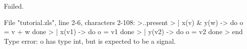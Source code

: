 \runverbatimfalse
{}
\begin{RunVerbatimMsg}
Failed.
\end{RunVerbatimMsg}
\begin{RunVerbatimErr}
File "tutorial.zls", line 2-6, characters 2-108:
>..present
>  | x(v) & y(w) -> do o = v + w done
>  | x(v1) -> do o = v1 done
>  | y(v2) -> do o = v2 done
>  end
Type error: o has type
int, but is expected to be a signal.
\end{RunVerbatimErr}
